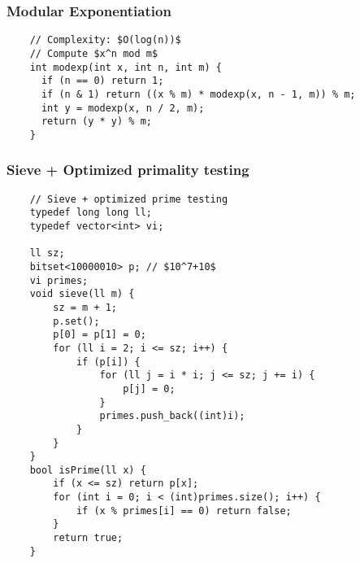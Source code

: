 \documentclass{article}
\begin{document}
\subsubsection{Modular Exponentiation}
\begin{verbatim}
    // Complexity: $O(log(n))$
    // Compute $x^n mod m$
    int modexp(int x, int n, int m) {
      if (n == 0) return 1;
      if (n & 1) return ((x % m) * modexp(x, n - 1, m)) % m;
      int y = modexp(x, n / 2, m);
      return (y * y) % m;
    }
\end{verbatim}

\subsubsection{Sieve + Optimized primality testing}
\begin{verbatim}
    // Sieve + optimized prime testing
    typedef long long ll;
    typedef vector<int> vi;

    ll sz;
    bitset<10000010> p; // $10^7+10$
    vi primes;
    void sieve(ll m) {
        sz = m + 1;
        p.set();
        p[0] = p[1] = 0;
        for (ll i = 2; i <= sz; i++) {
            if (p[i]) {
                for (ll j = i * i; j <= sz; j += i) {
                    p[j] = 0;
                }
                primes.push_back((int)i);
            }
        }
    }
    bool isPrime(ll x) {
        if (x <= sz) return p[x];
        for (int i = 0; i < (int)primes.size(); i++) {
            if (x % primes[i] == 0) return false;
        }
        return true;
    }
\end{verbatim}
\end{document}
